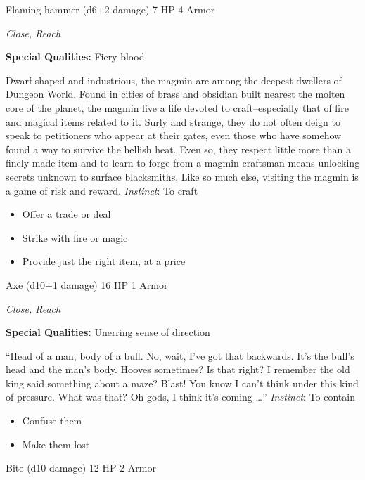 Flaming hammer (d6+2 damage)\hspace*{\fill} 7 HP 4 Armor

\emph{Close, Reach}

\textbf{Special Qualities:}
Fiery blood

\HRule
Dwarf-shaped and industrious, the magmin are among the deepest-dwellers of Dungeon World. Found in cities of brass and obsidian built nearest the molten core of the planet, the magmin live a life devoted to craft--especially that of fire and magical items related to it. Surly and strange, they do not often deign to speak to petitioners who appear at their gates, even those who have somehow found a way to survive the hellish heat. Even so, they respect little more than a finely made item and to learn to forge from a magmin craftsman means unlocking secrets unknown to surface blacksmiths. Like so much else, visiting the magmin is a game of risk and reward. \emph{Instinct}: To craft
\begin{itemize}
\item Offer a trade or deal
\item Strike with fire or magic
\item Provide just the right item, at a price
\end{itemize}

\HRule
{}

Axe (d10+1 damage)\hspace*{\fill} 16 HP 1 Armor

\emph{Close, Reach}

\textbf{Special Qualities:}
Unerring sense of direction

\HRule
``Head of a man, body of a bull. No, wait, I've got that backwards. It's the bull's head and the man's body. Hooves sometimes? Is that right? I remember the old king said something about a maze? Blast! You know I can't think under this kind of pressure. What was that? Oh gods, I think it's coming \ldots '' \emph{Instinct}: To contain
\begin{itemize}
\item Confuse them
\item Make them lost
\end{itemize}
\newpage
\HRule
{}

Bite (d10 damage)\hspace*{\fill} 12 HP 2 Armor

